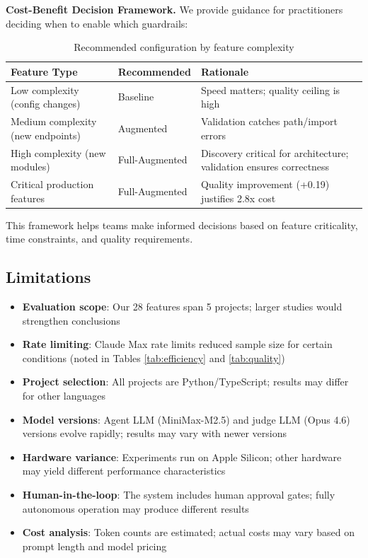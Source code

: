 \documentclass[sigconf,anonymous,review]{acmart}
\begin{document}
\textbf{Cost-Benefit Decision Framework.} We provide guidance for practitioners deciding when to enable which guardrails:

\begin{table}[ht]
  \centering
  \caption{Recommended configuration by feature complexity}
  \label{tab:config-guidance}
  \begin{tabular}{llp{5cm}}
    \hline
    \textbf{Feature Type} & \textbf{Recommended} & \textbf{Rationale} \\
    \hline
    Low complexity (config changes) & Baseline & Speed matters; quality ceiling is high \\
    Medium complexity (new endpoints) & Augmented & Validation catches path/import errors \\
    High complexity (new modules) & Full-Augmented & Discovery critical for architecture; validation ensures correctness \\
    Critical production features & Full-Augmented & Quality improvement (+0.19) justifies 2.8x cost \\
    \hline
  \end{tabular}
\end{table}

This framework helps teams make informed decisions based on feature criticality, time constraints, and quality requirements.

\subsection{Limitations}

\begin{itemize}
  \item \textbf{Evaluation scope}: Our 28 features span 5 projects; larger studies would strengthen conclusions
  \item \textbf{Rate limiting}: Claude Max rate limits reduced sample size for certain conditions (noted in Tables \ref{tab:efficiency} and \ref{tab:quality})
  \item \textbf{Project selection}: All projects are Python/TypeScript; results may differ for other languages
  \item \textbf{Model versions}: Agent LLM (MiniMax-M2.5) and judge LLM (Opus 4.6) versions evolve rapidly; results may vary with newer versions
  \item \textbf{Hardware variance}: Experiments run on Apple Silicon; other hardware may yield different performance characteristics
  \item \textbf{Human-in-the-loop}: The system includes human approval gates; fully autonomous operation may produce different results
  \item \textbf{Cost analysis}: Token counts are estimated; actual costs may vary based on prompt length and model pricing
\end{itemize}
\end{document}
